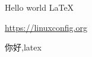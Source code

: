 \documentclass{article}
\begin{document}
Hello world \LaTeX

\url{https://linuxconfig.org}

你好,latex
\end{document}
